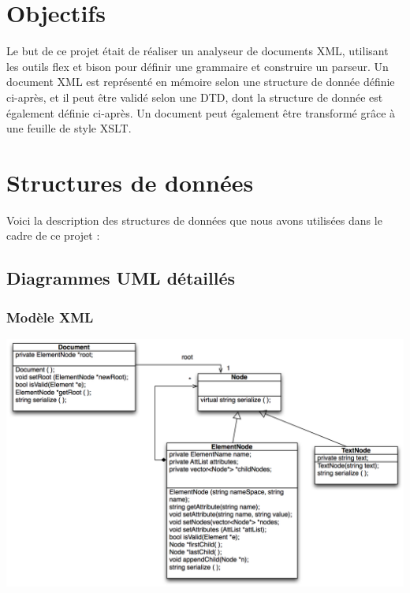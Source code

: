 
\section{Objectifs}

Le but de ce projet était de réaliser un analyseur de documents XML, utilisant les outils flex et bison pour définir une grammaire et construire un parseur. Un document XML est représenté en mémoire selon une structure de donnée définie ci-après, et il peut être validé selon une DTD, dont la structure de donnée est également définie ci-après. Un document peut également être transformé grâce à une feuille de style XSLT.

\section{Structures de données}

Voici la description des structures de données que nous avons utilisées dans le cadre de ce projet :

\subsection{Diagrammes UML détaillés}

\subsubsection{Modèle XML}

\medskip
\begin {center}
\includegraphics[width=\textwidth]{UMLXML.png}
\end {center}
\medskip

